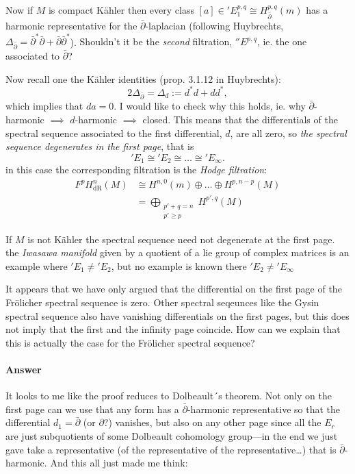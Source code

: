 \begin{definition}
Now if $M$ is compact K\"ahler then every class $[a]\in 'E^{p,q}_1\cong H^{p,q}_{\bar\partial}(m)$ has a harmonic representative for the $\bar\partial$-laplacian (following Huybrechts, $\Delta_{\bar\partial}=\bar\partial^*\bar\partial+\bar\partial\bar\partial^*$). {\color{blue}Shouldn't it be the \textit{second} filtration, $''E^{p,q}$, ie. the one associated to $\bar\partial$?}

Now recall one the K\"ahler identities (prop. 3.1.12 in Huybrechts):
$$2\Delta_{\bar\partial}=\Delta_d:=d^*d+dd^*,$$
which {\color{blue}implies} that $da=0$. {\color{blue}I would like to check why this holds, ie. why $\bar\partial$-harmonic $\implies$ $d$-harmonic $\implies$ closed}. This means that the differentials of the spectral sequence associated to the first differential, $d$, are all zero, so \textit{the spectral sequence degenerates in the first page}, that is
$$'E_1\cong 'E_2\cong \ldots\cong 'E_\infty.$$
in this case the corresponding filtration is the {\it Hodge filtration}:
\begin{align*}
	F^pH^{n}_{\text{dR}}(M)&\cong H^{n,0}(m)\oplus\ldots\oplus H^{p,n-p}(M)\\
				       &=\bigoplus_{\substack{p'+q=n \\ p'\geq p}}  H^{p',q}(M)
\end{align*}
\begin{remark}
If $M$ is not K\"ahler the spectral sequence need not degenerate at the first page. the {\it Iwasawa manifold} given by a quotient of a lie group of complex matrices is an example where $'E_1\neq 'E_2$, but no example is known there ${'E_2\neq 'E_\infty}$
\end{remark}

\begin{question}[Altan]
	It appears that we have only argued that the differential on the first page of the Fr\"olicher spectral sequence is zero. Other spectral seqeunces like the Gysin spectral sequence also have vanishing differentials on the first pages, but this does not imply that the first and the infinity page coincide. How can we explain that this is actually the case for the Fr\"olicher spectral sequence?
\end{question}

\paragraph{Answer}It looks to me like the proof reduces to Dolbeault´s theorem. Not only on the first page can we use that any form has a $\bar\partial$-harmonic representative so that the differential $d_1=\bar\partial$ (or $\partial$?) vanishes, but also on any other page since all the $E_{r}$ are just subquotients of some Dolbeault cohomology group---in the end we just gave take a representative (of the representative of the representative…) that is $\bar\partial$-harmonic. And this all just made me think:


\end{definition}
